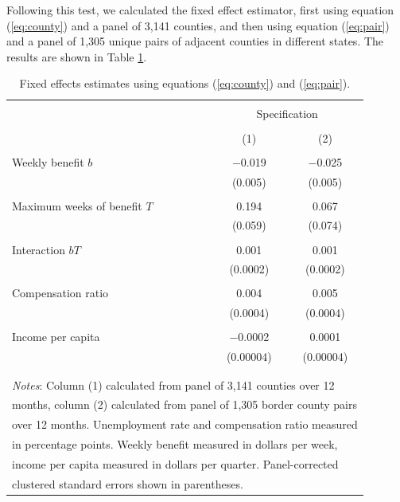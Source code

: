 \documentclass[12pt]{article}
\begin{document}
Following this test, we calculated the fixed effect estimator, first using equation (\ref{eq:county}) and a panel of 3,141 counties, and then using equation (\ref{eq:pair}) and a panel of 1,305 unique pairs of adjacent counties in different states. The results are shown in Table \ref{tab:results}.

\begin{table}[!htbp] \centering 
	\small
	\caption{Fixed effects estimates using equations (\ref{eq:county}) and (\ref{eq:pair}).} 
	\label{tab:results} 
	\begin{tabular}{@{\extracolsep{5pt}}lcc} 
		\\[-1.8ex]\hline 
		\hline \\[-1.8ex] 
		& \multicolumn{2}{c}{Specification} \\ 
		\cline{2-3} 
		\\[-1.8ex] & (1) & (2)\\ 
		\hline \\[-1.8ex] 
		Weekly benefit $b$ & $-$0.019 & $-$0.025 \\ 
		& (0.005) & (0.005) \\ 
		& & \\ 
		Maximum weeks of benefit $T$ & 0.194 & 0.067 \\ 
		& (0.059) & (0.074) \\ 
		& & \\ 
		Interaction $bT$ & 0.001 & 0.001 \\ 
		& (0.0002) & (0.0002) \\ 
		& & \\ 
		Compensation ratio & 0.004 & 0.005 \\ 
		& (0.0004) & (0.0004) \\ 
		& & \\ 
		Income per capita & $-$0.0002 & 0.0001  \\ 
		& (0.00004) & (0.00004) \\ 
		& & \\ 
		\hline 
		\hline \\[-1.8ex] 
		\multicolumn{3}{l}{\footnotesize \textit{Notes}: Column (1) calculated from panel of 3,141 counties over 12}\\
		\multicolumn{3}{l}{\footnotesize months, column (2) calculated from panel of 1,305 border county pairs} \\
		\multicolumn{3}{l}{\footnotesize over 12 months. Unemployment rate and compensation ratio measured} \\
		\multicolumn{3}{l}{\footnotesize in percentage points. Weekly benefit measured in dollars per week,} \\
		\multicolumn{3}{l}{\footnotesize income per capita measured in dollars per quarter. Panel-corrected} \\
		\multicolumn{3}{l}{\footnotesize clustered standard errors shown in parentheses.} \\
		\end{tabular} 
\end{table} 
\end{document}
